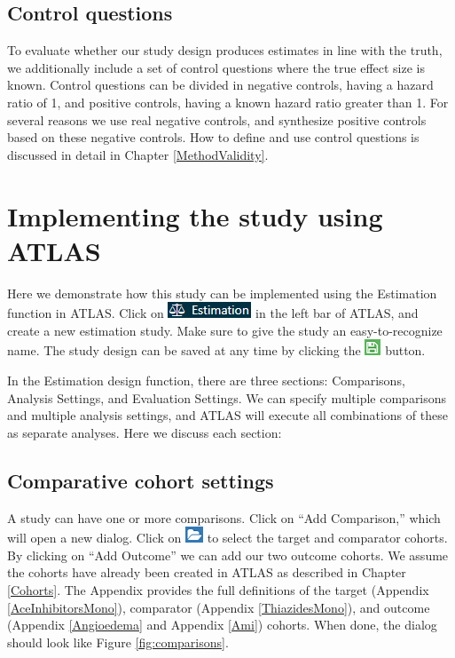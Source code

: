 \documentclass[11pt]{book}
\theoremstyle{definition}
\theoremstyle{definition}
\theoremstyle{definition}
\theoremstyle{remark}
\begin{document}
\hypertarget{control-questions}{%
\subsection{Control questions}\label{control-questions}}

To evaluate whether our study design produces estimates in line with the truth, we additionally include a set of control questions where the true effect size is known. Control questions can be divided in negative controls, having a hazard ratio of 1, and positive controls, having a known hazard ratio greater than 1. For several reasons we use real negative controls, and synthesize positive controls based on these negative controls. How to define and use control questions is discussed in detail in Chapter \ref{MethodValidity}.

\hypertarget{PleAtlas}{%
\section{Implementing the study using ATLAS}\label{PleAtlas}}

Here we demonstrate how this study can be implemented using the Estimation function in ATLAS. Click on \includegraphics{images/PopulationLevelEstimation/estimation.png} in the left bar of ATLAS, and create a new estimation study. Make sure to give the study an easy-to-recognize name. The study design can be saved at any time by clicking the \includegraphics{images/PopulationLevelEstimation/save.png} button.

In the Estimation design function, there are three sections: Comparisons, Analysis Settings, and Evaluation Settings. We can specify multiple comparisons and multiple analysis settings, and ATLAS will execute all combinations of these as separate analyses. Here we discuss each section:

\hypertarget{ComparisonSettings}{%
\subsection{Comparative cohort settings}\label{ComparisonSettings}}

A study can have one or more comparisons. Click on ``Add Comparison,'' which will open a new dialog. Click on \includegraphics{images/PopulationLevelEstimation/open.png} to select the target and comparator cohorts. By clicking on ``Add Outcome'' we can add our two outcome cohorts. We assume the cohorts have already been created in ATLAS as described in Chapter \ref{Cohorts}. The Appendix provides the full definitions of the target (Appendix \ref{AceInhibitorsMono}), comparator (Appendix \ref{ThiazidesMono}), and outcome (Appendix \ref{Angioedema} and Appendix \ref{Ami}) cohorts. When done, the dialog should look like Figure \ref{fig:comparisons}.
\end{document}
